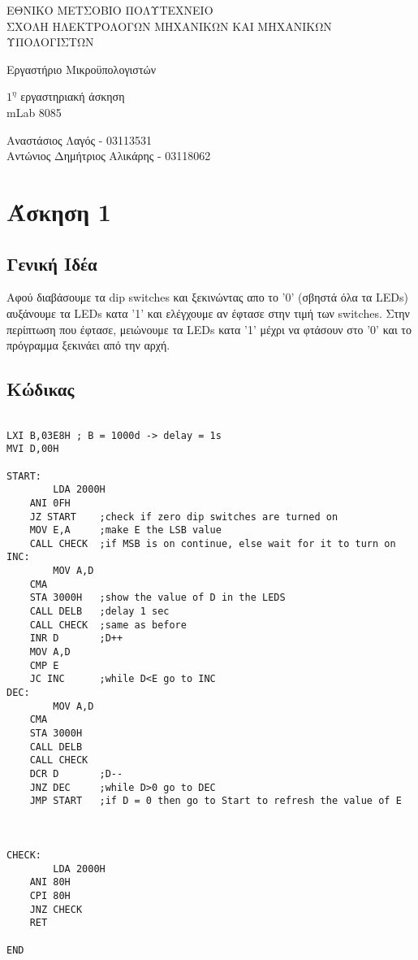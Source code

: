 \documentclass[11pt]{article}
\begin{document}
\begin{titlepage}
	\begin{center}
		{ 
			ΕΘΝΙΚΟ ΜΕΤΣΟΒΙΟ ΠΟΛΥΤΕΧΝΕΙΟ\\
			ΣΧΟΛΗ ΗΛΕΚΤΡΟΛΟΓΩΝ ΜΗΧΑΝΙΚΩΝ ΚΑΙ ΜΗΧΑΝΙΚΩΝ ΥΠΟΛΟΓΙΣΤΩΝ
		}
		
		\vfill

		{\Large
			Εργαστήριο Μικροϋπολογιστών
		}
		
		{\large
			$1^η$ εργαστηριακή άσκηση \\ mLab 8085
		}

		\vfill

		{
			Αναστάσιος Λαγός - 03113531\\
			Αντώνιος Δημήτριος Αλικάρης - 03118062
		}
	\end{center}
\end{titlepage}


\section*{Άσκηση 1}

\subsection*{Γενική Ιδέα}

Αφού διαβάσουμε τα dip switches και ξεκινώντας απο το '0' (σβηστά όλα τα LEDs) αυξάνουμε τα LEDs κατα '1' και ελέγχουμε αν έφτασε στην τιμή των switches. Στην περίπτωση που έφτασε, μειώνουμε τα LEDs κατα '1' μέχρι να φτάσουν στο '0' και το πρόγραμμα ξεκινάει από την αρχή.

\subsection*{Κώδικας}

\begin{verbatim}

LXI B,03E8H ; B = 1000d -> delay = 1s
MVI D,00H

START:
        LDA 2000H
	ANI 0FH
	JZ START	;check if zero dip switches are turned on
	MOV E,A	    ;make E the LSB value
	CALL CHECK	;if MSB is on continue, else wait for it to turn on
INC:
        MOV A,D
	CMA
	STA 3000H	;show the value of D in the LEDS
	CALL DELB	;delay 1 sec
	CALL CHECK	;same as before
	INR D		;D++
	MOV A,D
	CMP E
	JC INC		;while D<E go to INC
DEC:
        MOV A,D
	CMA
	STA 3000H
	CALL DELB
	CALL CHECK
	DCR D		;D--
	JNZ DEC 	;while D>0 go to DEC
	JMP START	;if D = 0 then go to Start to refresh the value of E



CHECK:
        LDA 2000H
	ANI 80H
	CPI 80H
	JNZ CHECK
	RET

END	

\end{verbatim}
\end{document}
